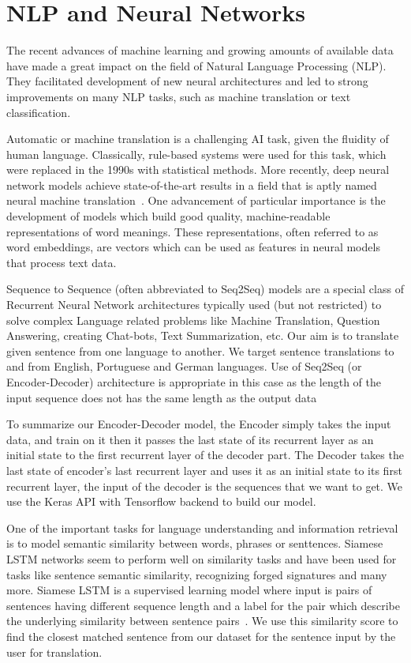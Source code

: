 \documentclass[runningheads]{llncs}
\begin{document}
	\section{NLP and Neural Networks}
	The recent advances of machine learning and growing amounts of available data have made a great impact on the field of  Natural Language Processing (NLP). They facilitated development of new neural architectures and led to strong improvements on many NLP tasks, such as machine translation or text classification. 
	
	Automatic or machine translation is a challenging AI task, given the fluidity of human language. Classically, rule-based systems were used for this task, which were replaced in the 1990s with statistical methods. More recently, deep neural network models achieve state-of-the-art results in a field that is aptly named neural machine translation~\cite{ref_url16}.
	One advancement of particular importance is the development of models which build good quality, machine-readable representations of word meanings. These representations, often referred to as word embeddings, are vectors which can be used as features in neural models that process text data.
	
	Sequence to Sequence (often abbreviated to Seq2Seq) models are a special class of Recurrent Neural Network architectures typically used (but not restricted) to solve complex Language related problems like Machine Translation, Question Answering, creating Chat-bots, Text Summarization, etc. Our aim is to translate given sentence from one language to another. We target sentence translations to and from English, Portuguese and German languages. Use of Seq2Seq (or Encoder-Decoder) architecture is appropriate in this case as the length of the input sequence  does not has the same length as the output data
	
	To summarize our Encoder-Decoder model, the Encoder simply takes the input data, and train on it then it passes the last state of its recurrent layer as an initial state to the first recurrent layer of the decoder part. The Decoder takes the last state of encoder’s last recurrent layer and uses it as an initial state to its first recurrent layer, the input of the decoder is the sequences that we want to get. We use the Keras API with Tensorflow backend to build our model.
	
	One of the important tasks for language understanding and information retrieval is to model semantic similarity between words, phrases or senttences. Siamese LSTM networks seem to perform well on similarity tasks and have been used for tasks like sentence semantic similarity, recognizing forged signatures and many more.
	Siamese LSTM is a supervised learning model where input is pairs of sentences having different sequence length and a label for the pair which describe the underlying similarity between sentence pairs~\cite{ref_url21}. We use this similarity score to find the closest matched sentence from our dataset for the sentence input by the user for translation.
	
\end{document}
